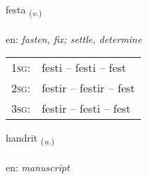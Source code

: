 \documentclass[frontgrid, backgrid]{flacards}\usepackage[]{graphicx}\usepackage[]{color}
\begin{document}
\renewcommand{\flhead}{\vskip5pt \fboxsep=0pt {\small\bfseries\footnotesize Sagnorð | Verb}}
\renewcommand{\fcfoot}{\vskip5pt \fboxsep=0pt \hspace{2pt}{\small\bfseries\footnotesize 2K}}

\renewcommand{\blhead}{\vskip5pt {\small\bfseries\footnotesize Sagnorð | Verb }}
\renewcommand{\bcfoot}{\vskip5pt \hspace{2pt}{\small\bfseries\footnotesize 2K}}


{festa \small{\textsubscript{(\textit{v.})}} \\[1ex] %
\textphonetic{[fɛsta]} \\
en: \emph{fasten, fix; settle, determine} \\  [2ex]
\renewcommand*{\arraystretch}{0.8}
\begin{tabular}{p{1cm}l}
\textsc{1sg}: & festi -- festi -- fest \\ 
\textsc{2sg}: & festir -- festir -- fest \\ 
\textsc{3sg}: & festir -- festi -- fest \\ 
\end{tabular}
}

\renewcommand{\flhead}{\vskip5pt \fboxsep=0pt {\small\bfseries\footnotesize Nafnorð | Noun}}
\renewcommand{\fcfoot}{\vskip5pt \fboxsep=0pt \hspace{2pt}{\small\bfseries\footnotesize 2K}}

\renewcommand{\blhead}{\vskip5pt {\small\bfseries\footnotesize Nafnorð | Noun }}
\renewcommand{\bcfoot}{\vskip5pt \hspace{2pt}{\small\bfseries\footnotesize 2K}}


{handrit \small{\textsubscript{(\textit{n.})}} \\[1ex] %
\textphonetic{[hantrɪt]} \\
en: \emph{manuscript} \\  [2ex]
\renewcommand*{\arraystretch}{0.8}
}
\end{document}
